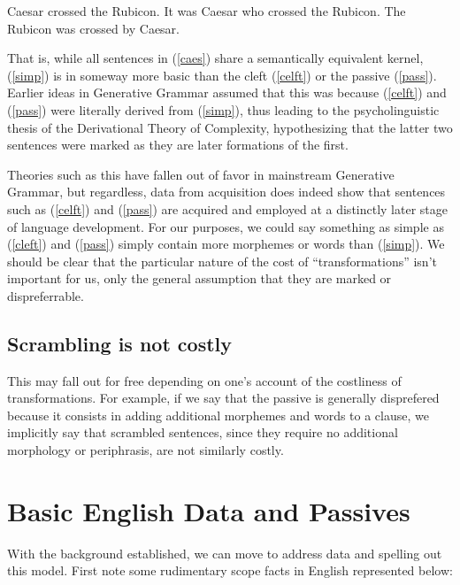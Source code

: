 \documentclass{article}
\begin{document}
\begin{exe}
	\ex\label{caes}
	\begin{xlist}
	\ex Caesar crossed the Rubicon.\label{simp}
	\ex It was Caesar who crossed the Rubicon.\label{celft}
	\ex The Rubicon was crossed by Caesar.\label{pass}
	\end{xlist}
\end{exe}

That is, while all sentences in (\ref{caes}) share a semantically equivalent kernel, (\ref{simp}) is in someway more basic than the cleft (\ref{celft}) or the passive (\ref{pass}).
Earlier ideas in Generative Grammar assumed that this was because (\ref{celft}) and (\ref{pass}) were literally derived from (\ref{simp}), thus leading to the psycholinguistic thesis of the Derivational Theory of Complexity, hypothesizing that the latter two sentences were marked as they are later formations of the first.

Theories such as this have fallen out of favor in mainstream Generative Grammar, but regardless, data from acquisition does indeed show that sentences such as (\ref{celft}) and (\ref{pass}) are acquired and employed at a distinctly later stage of language development.
For our purposes, we could say something as simple as (\ref{cleft}) and (\ref{pass}) simply contain more morphemes or words than (\ref{simp}).
We should be clear that the particular nature of the cost of ``transformations'' isn't important for us, only the general assumption that they are marked or dispreferrable.


\subsection{Scrambling is not costly}

This may fall out for free depending on one's account of the costliness of transformations.
For example, if we say that the passive is generally disprefered because it consists in adding additional morphemes and words to a clause, we implicitly say that scrambled sentences, since they require no additional morphology or periphrasis, are not similarly costly.

\section{Basic English Data and Passives\label{eng}}

With the background established, we can move to address data and spelling out this model.
First note some rudimentary scope facts in English represented below:
\end{document}
